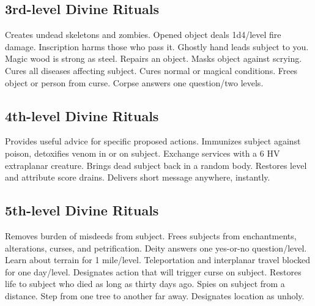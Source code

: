 \subsection{3rd-level Divine Rituals}
\begin{rituallist}
 Creates undead skeletons and zombies.
 Opened object deals 1d4/level fire damage.
\M Inscription harms those who pass it.
 Ghostly hand leads subject to you.
 Magic wood is strong as steel.
 Repairs an object.
 Masks object against scrying.
 Cures all diseases affecting subject.
 Cures normal or magical conditions.
 Frees object or person from curse.
 Corpse answers one question/two levels.
\end{rituallist}

\subsection{4th-level Divine Rituals}
\begin{rituallist}
 Provides useful advice for specific proposed actions.
 Immunizes subject against poison, detoxifies venom in or on subject.
 Exchange services with a 6 HV extraplanar creature.
 Brings dead subject back in a random body.
 Restores level and attribute score drains.
 Delivers short message anywhere, instantly.
\end{rituallist}

\subsection{5th-level Divine Rituals}
\begin{rituallist}
\F\M Removes burden of misdeeds from subject.
 Frees subjects from enchantments, alterations, curses, and petrification.
 Deity answers one yes-or-no question/level.
 Learn about terrain for 1 mile/level.
 Teleportation and interplanar travel blocked for one day/level.
 Designates action that will trigger curse on subject.
 Restores life to subject who died as long as thirty days ago.
\F Spies on subject from a distance.
 Step from one tree to another far away.
 Designates location as unholy.
\end{rituallist}

